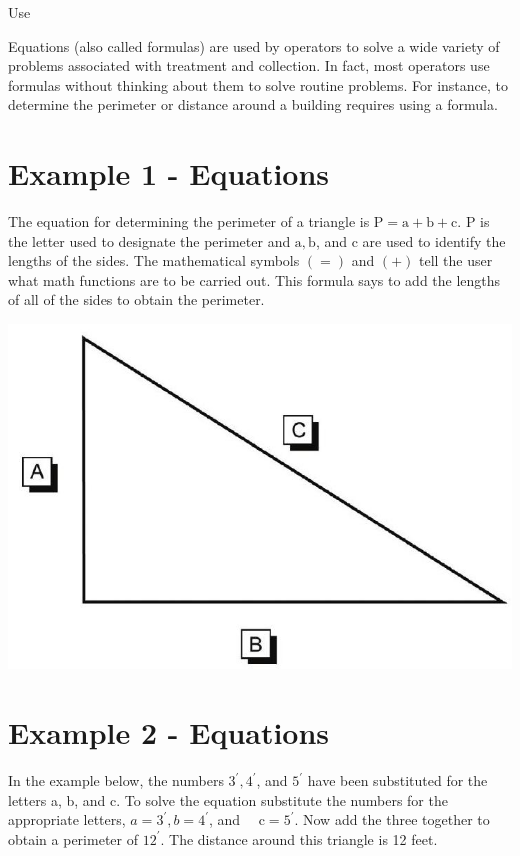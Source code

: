 \documentclass[10pt]{article}
\begin{document}
Use

Equations (also called formulas) are used by operators to solve a wide variety of problems associated with treatment and collection. In fact, most operators use formulas without thinking about them to solve routine problems. For instance, to determine the perimeter or distance around a building requires using a formula.

\section{Example 1 - Equations}
The equation for determining the perimeter of a triangle is $\mathrm{P}=\mathrm{a}+\mathrm{b}+\mathrm{c}$. $\mathrm{P}$ is the letter used to designate the perimeter and $\mathrm{a}, \mathrm{b}$, and $\mathrm{c}$ are used to identify the lengths of the sides. The mathematical symbols $(=)$ and $(+)$ tell the user what math functions are to be carried out. This formula says to add the lengths of all of the sides to obtain the perimeter.

\includegraphics[max width=\textwidth]{2022_09_11_72dbedc910e6e984560cg-17}

\section{Example 2 - Equations}
In the example below, the numbers $3^{\prime}, 4^{\prime}$, and $5^{\prime}$ have been substituted for the letters a, b, and c. To solve the equation substitute the numbers for the appropriate letters, $a=3^{\prime}, b=4^{\prime}$, and $\quad \mathrm{c}=5^{\prime}$. Now add the three together to obtain a perimeter of $12^{\prime}$. The distance around this triangle is 12 feet.
\end{document}

